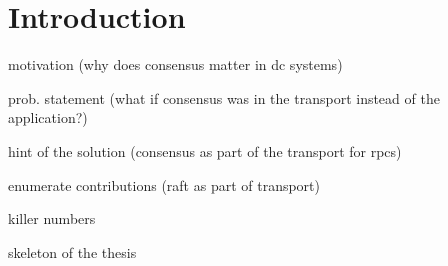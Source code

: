 \chapter{Introduction}

motivation (why does consensus matter in dc systems)

prob. statement (what if consensus was in the transport instead of the application?)

hint of the solution (consensus as part of the transport for rpcs)

enumerate contributions (raft as part of transport)

killer numbers

skeleton of the thesis

